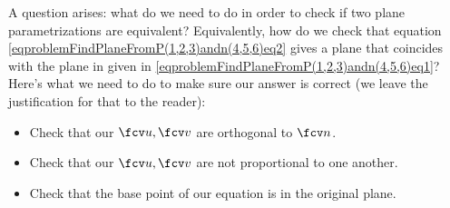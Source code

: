 {A question arises: what do we need to do in order to check if two plane parametrizations are equivalent? Equivalently, how do we check that equation \eqref{eqproblemFindPlaneFromP(1,2,3)andn(4,5,6)eq2} gives a plane that coincides with the plane in given in \eqref{eqproblemFindPlaneFromP(1,2,3)andn(4,5,6)eq1}? Here's what we need to do to make sure our answer is correct (we leave the justification for that to the reader):
\begin{itemize}
\item Check that our $\fcv u, \fcv v$ are orthogonal to $\fcv n$.
\item Check that our $\fcv u, \fcv v$ are not proportional to one another.
\item Check that the base point of our equation is in the original plane.
\end{itemize}

}
